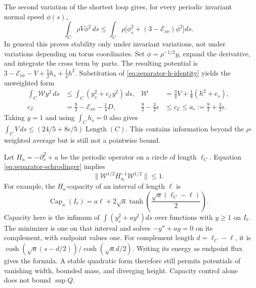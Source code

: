 \documentclass[a4paper,11pt]{article}
\numberwithin{equation}{section}
\theoremstyle{definition}
\begin{document}
The second variation of the shortest loop gives, for every periodic invariant normal speed $\phi(s)$,
\begin{equation}\label{eq:separator-jacobi}
 \int_C\rho V\phi^2\,ds\le
 \int_C\rho\bigl[\phi_s^2+(3-\mathcal E_{\nu\nu})\phi^2\bigr]ds.
\end{equation}
In general this proves stability only under invariant variations, not under variations depending on torus coordinates.
Set $\phi=\rho^{-1/2}y$, expand the derivative, and integrate the cross term by parts.
The resulting potential is
$3-\mathcal E_{\nu\nu}-V+\frac12h_s+\frac14h^2$.
Substitution of \eqref{eq:separator-h-identity} yields the unweighted form
\begin{align}
 \int_C\mathcal W y^2\,ds
 &\le\int_C(y_s^2+c_{\mathcal E}y^2)\,ds,
 &\mathcal W&=\tfrac34V+\tfrac18(h^2+e_s),\label{eq:separator-schrodinger}\\
 c_{\mathcal E}&=\tfrac92-\mathcal E_{\nu\nu}-\tfrac14D,
 &\tfrac92-\tfrac32\epsilon&\le c_{\mathcal E}\le a_\epsilon:=\tfrac92+\tfrac32\epsilon.
\end{align}
Taking $y=1$ and using $\int_C h_s=0$ also gives
$\int_CV\,ds\le(24/5+8\epsilon/5)\operatorname{Length}(C)$.
This contains information beyond the $\rho$-weighted average but is still not a pointwise bound.

Let $H_a=-\partial_s^2+a$ be the periodic operator on a circle of length $\ell_C$.
Equation \eqref{eq:separator-schrodinger} implies
\[
 \|\mathcal W^{1/2}H_{a_\epsilon}^{-1}\mathcal W^{1/2}\|\le1.
\]
For example, the $H_a$-capacity of an interval of length $\ell$ is
\[
 \operatorname{Cap}_a(I_\ell)
 =a\ell+2\sqrt a\tanh\!\left(\frac{\sqrt a(\ell_C-\ell)}2\right).
\]
Capacity here is the infimum of $\int(y_s^2+ay^2)ds$ over functions with $y\ge1$ on $I_\ell$.
The minimizer is one on that interval and solves $-y''+ay=0$ on its complement, with endpoint values one.
For complement length $d=\ell_C-\ell$, it is
$\cosh(\sqrt a(s-d/2))/\cosh(\sqrt a d/2)$.
Writing its energy as endpoint flux gives the formula.
A stable quadratic form therefore still permits potentials of vanishing width, bounded mass, and diverging height.
Capacity control alone does not bound $\sup Q$.
\end{document}
